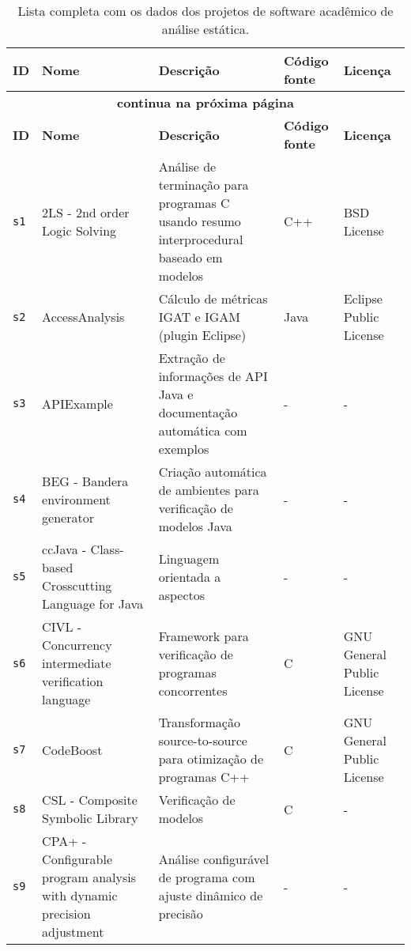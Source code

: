 \begin{longtable}{| l | p{4.5cm} | p{7cm} | p{1.5cm} | p{3cm} |}
  \caption{Lista completa com os dados dos projetos de software acadêmico de análise estática.}
  \label{software-table} \\
  \hline
  \endfirsthead
  \hline
  \textbf{ID} & \textbf{Nome} & \textbf{Descrição} & \textbf{Código fonte} & \textbf{Licença} \\
  \hline
  \endhead
  \multicolumn{5}{c}{\textbf{continua na próxima página}} \\
  \hhline{-----} \endfoot
  \endlastfoot
  \textbf{ID} & \textbf{Nome} & \textbf{Descrição} & \textbf{Código fonte} & \textbf{Licença} \\
  \hline
    \texttt{s1} &
      2LS - 2nd order Logic Solving &
      Análise de terminação para programas C usando resumo interprocedural baseado em modelos &
      C++ &
      BSD License \\
    \hline
    \texttt{s2} &
      AccessAnalysis &
      Cálculo de métricas IGAT e IGAM (plugin Eclipse) &
      Java &
      Eclipse Public License \\
    \hline
    \texttt{s3} &
      APIExample &
      Extração de informações de API Java e documentação automática com exemplos &
      - &
      - \\
    \hline
    \texttt{s4} &
      BEG - Bandera environment generator &
      Criação automática de ambientes para verificação de modelos Java &
      - &
      - \\
    \hline
    \texttt{s5} &
      ccJava - Class-based Crosscutting Language for Java &
      Linguagem orientada a aspectos &
      - &
      - \\
    \hline
    \texttt{s6} &
      CIVL - Concurrency intermediate verification language &
      Framework para verificação de programas concorrentes &
      C &
      GNU General Public License \\
    \hline
    \texttt{s7} &
      CodeBoost &
      Transformação source-to-source para otimização de programas C++ &
      C &
      GNU General Public License \\
    \hline
    \texttt{s8} &
      CSL - Composite Symbolic Library &
      Verificação de modelos &
      C &
      - \\
    \hline
    \texttt{s9} &
      CPA+ - Configurable program analysis with dynamic precision adjustment &
      Análise configurável de programa com ajuste dinâmico de precisão &
      - &
      - \\

\end{longtable}
